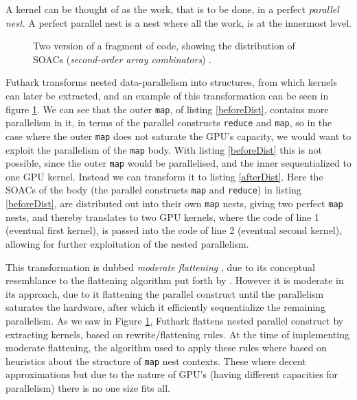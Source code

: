 A kernel can be thought of as the work, that is to be done, in a perfect \textit{parallel nest}. A perfect parallel nest is a nest where all the work, is at the innermost level. 
\begin{figure}[h]
\centering
	\hspace{2cm}
	\caption{Two version of a fragment of code, showing the distribution of SOACs (\textit{second-order array combinators}) \cite{futhark-moderate-blog}.}
	\label{loopDist}
\end{figure}
\noindent Futhark transforms nested data-parallelism into structures, from which kernels can later be extracted, and an example of this transformation can be seen in figure \ref{loopDist}. We can see that the outer \texttt{map}, of listing \ref{beforeDist}, contains more parallelism in it, in terms of the parallel constructs \texttt{reduce} and \texttt{map}, so in the case where the outer \texttt{map} does not saturate the GPU's capacity, we would want to exploit the parallelism of the \texttt{map} body. With listing \ref{beforeDist} this is not possible, since the outer \texttt{map} would be parallelised, and the inner sequentialized to one GPU kernel. Instead we can transform it to listing \ref{afterDist}. Here the SOACs of the body (the parallel constructs \texttt{map} and \texttt{reduce}) in listing \ref{beforeDist}, are distributed out into their own \texttt{map} nests, giving two perfect \texttt{map} nests, and thereby translates to two GPU kernels, where the code of line 1 (eventual first kernel), is passed into the code of line 2 (eventual second kernel), allowing for further exploitation of the nested parallelism.

This transformation is dubbed \textit{moderate flattening} \cite{futhark-nested-para}, due to its conceptual resemblance to the flattening algorithm put forth by \citeauthor{flat} \cite{flat}. However it is moderate in its approach, due to it flattening the parallel construct until the parallelism saturates the hardware, after which it efficiently sequentialize the remaining parallelism. As we saw in Figure \ref{loopDist}, Futhark flattens nested parallel construct by extracting kernels, based on rewrite/flattening rules. At the time of implementing moderate flattening, the algorithm used to apply these rules where based on heuristics about the structure of \texttt{map} nest contexts. These where decent approximations but due to the nature of GPU's (having different capacities for parallelism) there is no one size fits all. 

